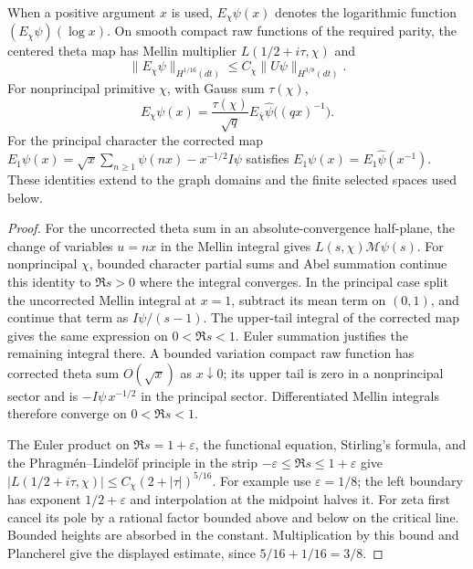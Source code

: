 \begin{lemma}\label{lem:theta-identities}
When a positive argument $x$ is used, $E_\chi\psi(x)$ denotes
the logarithmic function $(E_\chi\psi)(\log x)$.
On smooth compact raw functions of the required parity, the centered
theta map has Mellin multiplier $L(1/2+i\tau,\chi)$ and
\[
 \|E_\chi\psi\|_{H^{1/16}(dt)}
      \leq C_\chi\|U\psi\|_{H^{3/8}(dt)}.
\]
For nonprincipal primitive $\chi$, with Gauss sum $\tau(\chi)$,
\[
 E_\chi\psi(x)=\frac{\tau(\chi)}{\sqrt q}
     E_{\bar\chi}\widehat\psi\bigl((qx)^{-1}\bigr).
\]
For the principal character the corrected map
$E_1\psi(x)=\sqrt x\sum_{n\geq1}\psi(nx)-x^{-1/2}I\psi$
satisfies $E_1\psi(x)=E_1\widehat\psi(x^{-1})$.
These identities extend to the graph domains and the finite selected
spaces used below.
\end{lemma}
\begin{proof}
For the uncorrected theta sum in an absolute-convergence half-plane,
the change of variables $u=nx$ in the Mellin integral gives
$L(s,\chi)\mathcal M\psi(s)$.
For nonprincipal $\chi$, bounded character partial sums and Abel
summation continue this identity to $\Re s>0$ where the integral
converges. In the principal case split the uncorrected Mellin
integral at $x=1$, subtract its mean term on $(0,1)$, and continue
that term as $I\psi/(s-1)$. The upper-tail integral of the
corrected map gives the same expression on $0<\Re s<1$.
Euler summation justifies the remaining integral there. A bounded
variation compact raw function has corrected theta sum $O(\sqrt x)$
as $x\downarrow0$; its upper tail is zero in a nonprincipal sector
and is $-I\psi\,x^{-1/2}$ in the principal sector. Differentiated
Mellin integrals therefore converge on $0<\Re s<1$.

The Euler product on $\Re s=1+\varepsilon$, the functional equation,
Stirling's formula, and the Phragm\'en--Lindel\"of principle in the
strip $-\varepsilon\leq\Re s\leq1+\varepsilon$ give
$|L(1/2+i\tau,\chi)|\leq C_\chi(2+|\tau|)^{5/16}$.
For example use $\varepsilon=1/8$; the left boundary has exponent
$1/2+\varepsilon$ and interpolation at the midpoint halves it.
For zeta first cancel its pole by a rational factor bounded above
and below on the critical line. Bounded heights are absorbed in
the constant. Multiplication by this bound and Plancherel give the
displayed estimate, since $5/16+1/16=3/8$.


\end{proof}
